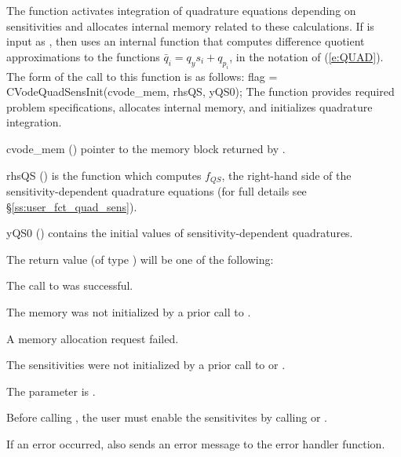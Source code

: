The function  activates integration of quadrature
equations depending on sensitivities and allocates internal memory
related to these calculations.  If  is input as ,
then {\cvodes} uses an internal function that computes difference quotient
approximations to the functions $\bar{q}_i = q_y s_i + q_{p_i}$, in the
notation of (\ref{e:QUAD}).
The form of the call to this function is as follows:
{
flag = CVodeQuadSensInit(cvode\_mem, rhsQS, yQS0);
}
{
  The function  provides required problem specifications,
  allocates internal memory, and initializes quadrature integration.
}
{
  \begin{args}
  \item[cvode\_mem] ()
    pointer to the {\cvodes} memory block returned by .
  \item[rhsQS] ()
    is the {\CC} function which computes $f_{QS}$, the right-hand side of the 
    sensitivity-dependent quadrature equations
    (for full details see \S\ref{ss:user_fct_quad_sens}).
  \item[yQS0] ()
    contains the initial values of sensitivity-dependent quadratures.
  \end{args}
}
{
  The return value  (of type ) will be one of the following:
  \begin{args}
  \item[\Id{CV\_SUCCESS}]
    The call to  was successful.
  \item[\Id{CVODE\_MEM\_NULL}] 
    The {\cvodes} memory was not initialized by a prior call to .
  \item[\Id{CVODE\_MEM\_FAIL}] 
    A memory allocation request failed.
  \item[\Id{CV\_NO\_SENS}] 
    The sensitivities were not initialized by a prior call to  or .
  \item[\Id{CV\_ILL\_INPUT}]
    The parameter  is .
  \end{args}
}
{
 
 {\warn} Before calling , the user must enable the sensitivites
  by calling  or .

  If an error occurred,  also sends an error message to the
  error handler function.
}
